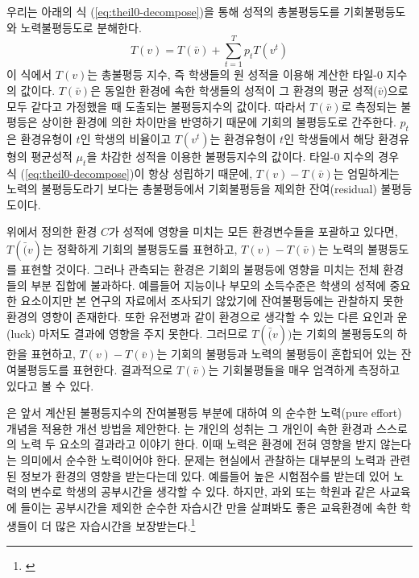 우리는 아래의 식 (\ref{eq:theil0-decompose})을 통해 성적의 총불평등도를 기회불평등도와 노력불평등도로 분해한다.
\begin{equation}
T(v)=T(\bar{v})+\sum_{t=1}^{T} p_{t} T\left(v^{t}\right)
 \label{eq:theil0-decompose}
\end{equation}
이 식에서 $T(v)$는 총불평등 지수, 즉 학생들의 원 성적을 이용해 계산한 타일-0 지수의 값이다.
$T(\bar{v})$은 동일한 환경에 속한 학생들의 성적이 그 환경의 평균 성적($\bar{v}$)으로 모두 같다고 가정했을 때 도출되는 불평등지수의 값이다.
따라서 $T(\bar{v})$로 측정되는 불평등은 상이한 환경에 의한 차이만을 반영하기 때문에 기회의 불평등도로 간주한다.
$p_t$은 환경유형이 $t$인 학생의 비율이고 $T(v^t)$는 환경유형이 $t$인 학생들에서 해당 환경유형의 평균성적 $\mu _t$을 차감한 성적을 이용한 불평등지수의 값이다.
 타일-0 지수의 경우 식 (\ref{eq:theil0-decompose})이 항상 성립하기 때문에, $T(v) - T(\bar{v})$는 엄밀하게는 노력의 불평등도라기 보다는 총불평등에서 기회불평등을 제외한 잔여(residual) 불평등도이다.
 

위에서 정의한 환경 $C$가 성적에 영향을 미치는 모든 환경변수들을 포괄하고 있다면, $T(\bar(v)$는 정확하게 기회의 불평등도를 표현하고, $T(v) - T(\bar{v})$는 노력의 불평등도를 표현할 것이다.
그러나 관측되는 환경은 기회의 불평등에 영향을 미치는 전체 환경들의 부분 집합에 불과하다.
예를들어 지능이나 부모의 소득수준은 학생의 성적에 중요한 요소이지만 본 연구의 자료에서 조사되기 않았기에 잔여불평등에는 관찰하지 못한 환경의 영향이 존재한다. 
또한 유전병과 같이 환경으로 생각할 수 있는 다른 요인과 운(luck) 마저도 결과에 영향을 주지 못한다.
그러므로 $T(\bar(v))$는 기회의 불평등도의 하한을 표현하고, $T(v) - T(\bar{v})$는 기회의 불평등과 노력의 불평등이 혼합되어 있는 잔여불평등도를 표현한다.
결과적으로 $T(\bar{v})$는 기회불평들을 매우 엄격하게 측정하고 있다고 볼 수 있다.
 
\citet{betl12}은 앞서 계산된 불평등지수의 잔여불평등 부분에 대하여 \citeauthor{Roemer98}의 순수한 노력(pure effort) 개념을 적용한 개선 방법을 제안한다.
 \citet{Roemer98}는 개인의 성취는 그 개인이 속한 환경과 스스로의 노력 두 요소의 결과라고 이야기 한다.
이때 노력은 환경에 전혀 영향을 받지 않는다는 의미에서 순수한 노력이어야 한다.
문제는 현실에서 관찰하는 대부분의 노력과 관련된 정보가 환경의 영향을 받는다는데 있다.
예를들어 높은 시험점수를 받는데 있어 노력의 변수로 학생의 공부시간을 생각할 수 있다.
하지만, 과외 또는 학원과 같은 사교육에 들이는 공부시간을 제외한 순수한 자습시간 만을 살펴봐도 좋은 교육환경에 속한 학생들이 더 많은 자습시간을 보장받는다.\footnote{\citet{ohetl16}}

